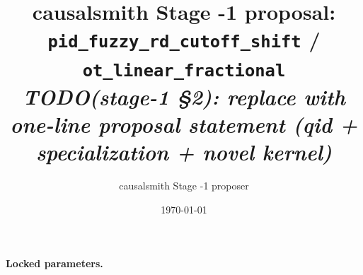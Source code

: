 \documentclass[11pt]{article}
\title{causalsmith Stage -1 proposal: \texttt{pid\_fuzzy\_rd\_cutoff\_shift} / \texttt{ot\_linear\_fractional}%
  \\ \large\textit{TODO(stage-1 \S2): replace with one-line proposal statement (qid + specialization + novel kernel)}}
\author{causalsmith Stage -1 proposer}
\date{\today}
\theoremstyle{definition}
\theoremstyle{plain}
\theoremstyle{remark}
\begin{document}
\maketitle


\paragraph{Locked parameters.}

\begin{abstract}
\end{abstract}
\end{document}
